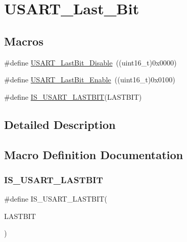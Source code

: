 \hypertarget{group___u_s_a_r_t___last___bit}{}\section{U\+S\+A\+R\+T\+\_\+\+Last\+\_\+\+Bit}
\label{group___u_s_a_r_t___last___bit}
\subsection*{Macros}
\begin{DoxyCompactItemize}
\item 
\#define \mbox{\hyperlink{group___u_s_a_r_t___last___bit_ga129c89b9e0dbb3ce43ee92589b3324e5}{U\+S\+A\+R\+T\+\_\+\+Last\+Bit\+\_\+\+Disable}}~((uint16\+\_\+t)0x0000)
\item 
\#define \mbox{\hyperlink{group___u_s_a_r_t___last___bit_gaf8c19d1ce01c6efff8c24ee82cc7b52e}{U\+S\+A\+R\+T\+\_\+\+Last\+Bit\+\_\+\+Enable}}~((uint16\+\_\+t)0x0100)
\item 
\#define \mbox{\hyperlink{group___u_s_a_r_t___last___bit_gaa941695e5612b53e9c2aca6a9fa0d695}{I\+S\+\_\+\+U\+S\+A\+R\+T\+\_\+\+L\+A\+S\+T\+B\+IT}}(L\+A\+S\+T\+B\+IT)
\end{DoxyCompactItemize}


\subsection{Detailed Description}


\subsection{Macro Definition Documentation}
\mbox{\label{group___u_s_a_r_t___last___bit_gaa941695e5612b53e9c2aca6a9fa0d695}} 
\subsubsection{\texorpdfstring{IS\_USART\_LASTBIT}{IS\_USART\_LASTBIT}}
{\footnotesize\ttfamily \#define I\+S\+\_\+\+U\+S\+A\+R\+T\+\_\+\+L\+A\+S\+T\+B\+IT(\begin{DoxyParamCaption}\item[{}]{L\+A\+S\+T\+B\+IT }\end{DoxyParamCaption})}

